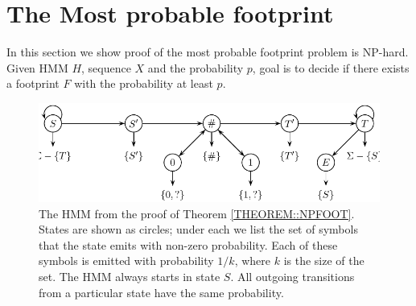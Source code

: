 
\section{The Most probable footprint}
\label{sec:footprint}

In this section we show proof of the most probable footprint problem is NP-hard. 
Given HMM $H$, sequence $X$ and the probability $p$, goal is to decide if there exists
a footprint $F$ with the probability at least $p$.
\begin{figure}
\centerline{\includegraphics[scale=0.68]{../figures/jcss/cliquehmm.pdf}}
\caption[HMM for which footprint is NP-hard to optimize]{\label{fig:footprint_hmm} The HMM from the proof of Theorem
  \ref{THEOREM::NPFOOT}. States are shown as circles; under each we
  list the set of symbols that the state emits with non-zero
  probability. Each of these symbols is emitted with probability
  $1/k$, where $k$ is the size of the set. The HMM always starts in
  state $S$. All outgoing transitions from a particular state have
  the same probability.}
\end{figure}


